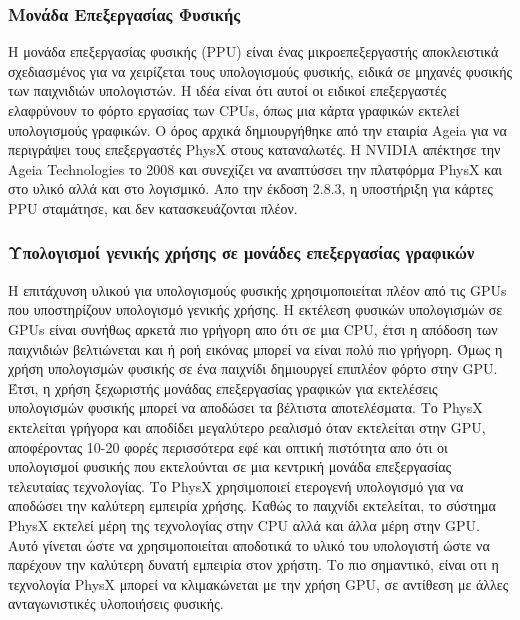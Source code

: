 \subsubsection{Μονάδα Επεξεργασίας Φυσικής}
Η μονάδα επεξεργασίας φυσικής (PPU) είναι ένας μικροεπεξεργαστής αποκλειστικά σχεδιασμένος για να χειρίζεται τους υπολογισμούς φυσικής, ειδικά σε μηχανές φυσικής των παιχνιδιών υπολογιστών. Η ιδέα είναι ότι αυτοί οι ειδικοί επεξεργαστές ελαφρύνουν το φόρτο εργασίας των CPUs, όπως μια κάρτα γραφικών εκτελεί υπολογισμούς γραφικών. Ο όρος αρχικά δημιουργήθηκε από την εταιρία Ageia για να περιγράψει τους επεξεργαστές PhysX στους καταναλωτές.
H NVIDIA απέκτησε την Ageia Technologies το 2008 και συνεχίζει να αναπτύσσει την πλατφόρμα PhysX και στο υλικό αλλά και στο λογισμικό. Απο την έκδοση 2.8.3, η υποστήριξη για κάρτες PPU σταμάτησε, και δεν κατασκευάζονται πλέον.  
\subsubsection{Υπολογισμοί γενικής χρήσης σε μονάδες επεξεργασίας γραφικών}
Η επιτάχυνση υλικού για υπολογισμούς φυσικής χρησιμοποιείται πλέον από τις GPUs που υποστηρίζουν υπολογισμό γενικής χρήσης. Η εκτέλεση φυσικών υπολογισμών σε GPUs είναι συνήθως αρκετά πιο γρήγορη απο ότι σε μια CPU, έτσι η απόδοση των παιχνιδιών βελτιώνεται και ή ροή εικόνας μπορεί να είναι πολύ πιο γρήγορη. Όμως η χρήση υπολογισμών φυσικής σε ένα παιχνίδι δημιουργεί επιπλέον φόρτο στην GPU. Έτσι, η χρήση ξεχωριστής μονάδας επεξεργασίας γραφικών για εκτελέσεις υπολογισμών φυσικής μπορεί να αποδώσει τα βέλτιστα αποτελέσματα. Το PhysX εκτελείται γρήγορα και αποδίδει μεγαλύτερο ρεαλισμό όταν εκτελείται στην GPU, αποφέροντας 10-20 φορές περισσότερα εφέ και οπτική πιστότητα απο ότι οι υπολογισμοί φυσικής που εκτελούνται σε μια κεντρική μονάδα επεξεργασίας τελευταίας τεχνολογίας. Το PhysX χρησιμοποιεί ετερογενή υπολογισμό για να αποδώσει την καλύτερη εμπειρία χρήσης. Καθώς το παιχνίδι εκτελείται, το σύστημα PhysX εκτελεί μέρη της τεχνολογίας στην CPU αλλά και άλλα μέρη στην GPU. Αυτό γίνεται ώστε να χρησιμοποιείται αποδοτικά το υλικό του υπολογιστή ώστε να παρέχουν την καλύτερη δυνατή εμπειρία στον χρήστη. Το πιο σημαντικό, είναι οτι η τεχνολογία PhysX μπορεί να κλιμακώνεται με την χρήση GPU, σε αντίθεση με άλλες ανταγωνιστικές υλοποιήσεις φυσικής.
